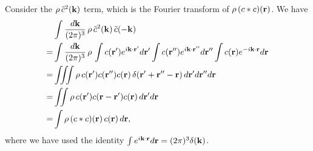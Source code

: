 \documentclass[12pt]{article}
\begin{document}
Consider the $\rho \, \tilde{c}^2(\mathbf{k})$ term,
  which is the Fourier transform of $\rho \, (c*c)(\mathbf{r})$.
%
We have
\begin{align*}
&  \int \frac{ d \mathbf{k} }{(2\pi)^3} \,
  \rho \, \tilde{c}^2(\mathbf{k}) \, \tilde{c}(-\mathbf{k}) \\
=&
  \int \frac{ d \mathbf{k} }{(2\pi)^3} \,
    \rho \,
    \int c(\mathbf{r}')  e^{ i \mathbf{k}\cdot \mathbf{r}'}   d \mathbf{r}'
    \int c(\mathbf{r}'') e^{ i \mathbf{k}\cdot \mathbf{r}''}  d \mathbf{r}''
    \int c(\mathbf{r})   e^{-i \mathbf{k}\cdot \mathbf{r}}    d \mathbf{r} \\
=&
    \iiint
    \rho \,
    c(\mathbf{r}') c(\mathbf{r}'') c(\mathbf{r})
    \, \delta(\mathbf{r}' + \mathbf{r}'' - \mathbf{r}) \,
    d \mathbf{r}'
    d \mathbf{r}''
    d \mathbf{r} \\
=&
    \iint
    \rho \,
    c(\mathbf{r}')  c(\mathbf{r} - \mathbf{r}') c(\mathbf{r}) \,
    d \mathbf{r}'
    d \mathbf{r} \\
=&  \int \rho \, (c*c)(\mathbf{r}) \, c(\mathbf{r}) \,
    d \mathbf{r},
\end{align*}
where we have used the identity
$\int e^{i \mathbf{k}\cdot \mathbf{r}} d \mathbf{r} = (2\pi)^3 \delta(\mathbf{k})$.
\end{document}
